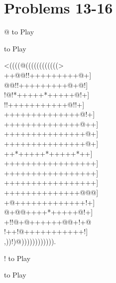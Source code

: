 \documentclass[mcrownvopaper,10pt,onecolumn,final]{memoir}
\begin{document}
\begin{figure}
\end{figure}
\section{Problems 13-16}
\begin{minipage}[c]{0.5\linewidth}
    \hspace{8.3mm} {\gnos%
        @
    }
    to Play
\end{minipage}
\begin{minipage}[c]{0.5\linewidth}
    \hspace{27mm}{\gnos%
        !
    }
    to Play
\end{minipage}
\begin{minipage}[c]{\linewidth}
    \centering
    {\gnos%
          <((((@((((((((((((>\\
    ++@@!!+++++++++@+]\\
    @@!!+++++++++@+@!]\\
          !@!*+++++*+++++@!+]\\
    !!+++++++++++@!!+]\\
    ++++++++++++++@!+]\\
    ++++++++++++++@++]\\
    +++++++++++++++@+]\\
    +++++++++++++++@+]\\
    ++*+++++*+++++*++]\\
    +++++++++++++++++]\\
    +++++++++++++++++]\\
    +++++++++++++++++]\\
    ++++++++++++++@@@]\\
    +@+++++++++++++!+]\\
    @+@@++++*+++++@!+]\\
    +!!@+@++++++@@+!+@\\
    !++!@+++++++++++!]\\
          ,))!)@)))))))))))).\\
    }
\end{minipage}
\begin{minipage}[c]{0.5\linewidth}
    \hspace{8.3mm} {\gnos%
        !
    }
    to Play
\end{minipage}
\begin{minipage}[c]{0.5\linewidth}
    \hspace{27mm}{\gnos%
        !
    }
    to Play
\end{minipage}
\newpage
\end{document}
